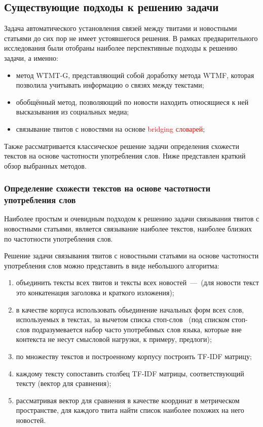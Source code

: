 \subsection{Существующие подходы к решению задачи}
    Задача автоматического установления связей между твитами и новостными статьями до сих пор не имеет устоявшегося решения.
    В рамках предварительного исследования были отобраны наиболее перспективные подходы к решению задачи, а именно:
    \begin{itemize}
        \item метод WTMT-G, представляющий собой доработку метода WTMF, которая позволила учитывать информацию о связях между текстами;
        \item обобщённый метод, позволяющий по новости находить относящиеся к ней высказывания из социальных медиа;
        \item связывание твитов с новостями на основе \textcolor{red}{bridging словарей};
    \end{itemize}
    Также рассматривается классическое решение задачи определения схожести текстов на основе частотности употребления слов.
    Ниже представлен краткий обзор выбранных методов.

    \subsubsection{Определение схожести текстов на основе частотности употребления слов}
        Наиболее простым и очевидным подходом к решению задачи связывания твитов с новостными статьями, является связывание наиболее текстов,
        наиболее близких по частотности употребления слов.

        Решение задачи связывания твитов с новостными статьями на основе частотности употребления слов можно представить в виде небольшого алгоритма:
        \begin{enumerate}
            \item объединить тексты всех твитов и тексты всех новостей~---~(для новости текст это конкатенация заголовка и краткого изложения);
            \item в качестве корпуса использовать объединение начальных форм всех слов, используемых в текстах, за вычетом списка стоп-слов~
            (под списком стоп-слов подразумевается набор часто употребимых слов языка, которые вне контекста не несут смысловой нагрузки, к примеру, предлоги);
            \item по множеству текстов и построенному корпусу построить TF-IDF матрицу;
            \item каждому тексту сопоставить столбец TF-IDF матрицы, соответствующий тексту (вектор для сравнения);
            \item рассматривая вектор для сравнения в качестве координат в метрическом пространстве, для каждого твита найти список наиболее похожих на него новостей.
        \end{enumerate}

